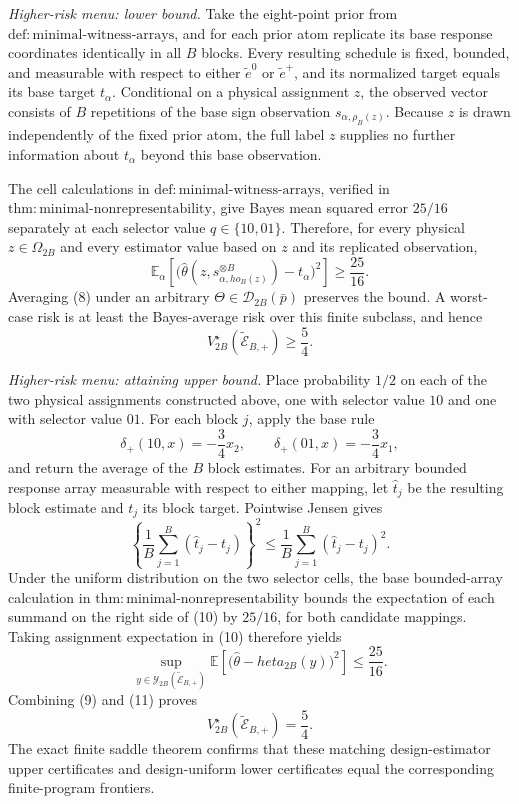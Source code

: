 \emph{Higher-risk menu: lower bound.}
Take the eight-point prior from \(\mathrm{def{:}minimal\text{-}witness\text{-}arrays}\), and for each prior atom replicate its base response coordinates identically in all \(B\) blocks.  Every resulting schedule is fixed, bounded, and measurable with respect to either \(\widetilde e^0\) or \(\widetilde e^+\), and its normalized target equals its base target \(t_\alpha\).  Conditional on a physical assignment \(z\), the observed vector consists of \(B\) repetitions of the base sign observation \(s_{\alpha,\rho_B(z)}\).  Because \(z\) is drawn independently of the fixed prior atom, the full label \(z\) supplies no further information about \(t_\alpha\) beyond this base observation.

The cell calculations in \(\mathrm{def{:}minimal\text{-}witness\text{-}arrays}\), verified in \(\mathrm{thm{:}minimal\text{-}nonrepresentability}\), give Bayes mean squared error \(25/16\) separately at each selector value \(q\in\{10,01\}\).  Therefore, for every physical \(z\in\Omega_{2B}\) and every estimator value based on \(z\) and its replicated observation,
\[
 \mathbb E_{\alpha}\!\left[
   \bigl(\widehat\theta(z,s_{\alpha,
ho_B(z)}^{\otimes B})-t_\alpha\bigr)^2
 \right]\ge\frac{25}{16}. \tag{8}
\]
Averaging (8) under an arbitrary \(\Theta\in\mathcal D_{2B}(\bar p)\) preserves the bound.  A worst-case risk is at least the Bayes-average risk over this finite subclass, and hence
\[
 V_{2B}^\star(\widetilde{\mathcal E}_{B,+})\ge\frac54. \tag{9}
\]

\emph{Higher-risk menu: attaining upper bound.}
Place probability \(1/2\) on each of the two physical assignments constructed above, one with selector value \(10\) and one with selector value \(01\).  For each block \(j\), apply the base rule
\[
 \delta_+(10,x)=-\frac34x_2,
 \qquad
 \delta_+(01,x)=-\frac34x_1,
\]
and return the average of the \(B\) block estimates.  For an arbitrary bounded response array measurable with respect to either mapping, let \(\widehat t_j\) be the resulting block estimate and \(t_j\) its block target.  Pointwise Jensen gives
\[
 \left\{\frac1B\sum_{j=1}^B(\widehat t_j-t_j)\right\}^2
 \le \frac1B\sum_{j=1}^B(\widehat t_j-t_j)^2. \tag{10}
\]
Under the uniform distribution on the two selector cells, the base bounded-array calculation in \(\mathrm{thm{:}minimal\text{-}nonrepresentability}\) bounds the expectation of each summand on the right side of (10) by \(25/16\), for both candidate mappings.  Taking assignment expectation in (10) therefore yields
\[
 \sup_{y\in\mathcal Y_{2B}(\widetilde{\mathcal E}_{B,+})}
 \mathbb E\!\left[
   \bigl(\widehat\theta-  heta_{2B}(y)\bigr)^2
 \right]
 \le\frac{25}{16}. \tag{11}
\]
Combining (9) and (11) proves
\[
 V_{2B}^\star(\widetilde{\mathcal E}_{B,+})=\frac54. \tag{12}
\]
The exact finite saddle theorem confirms that these matching design-estimator upper certificates and design-uniform lower certificates equal the corresponding finite-program frontiers.

